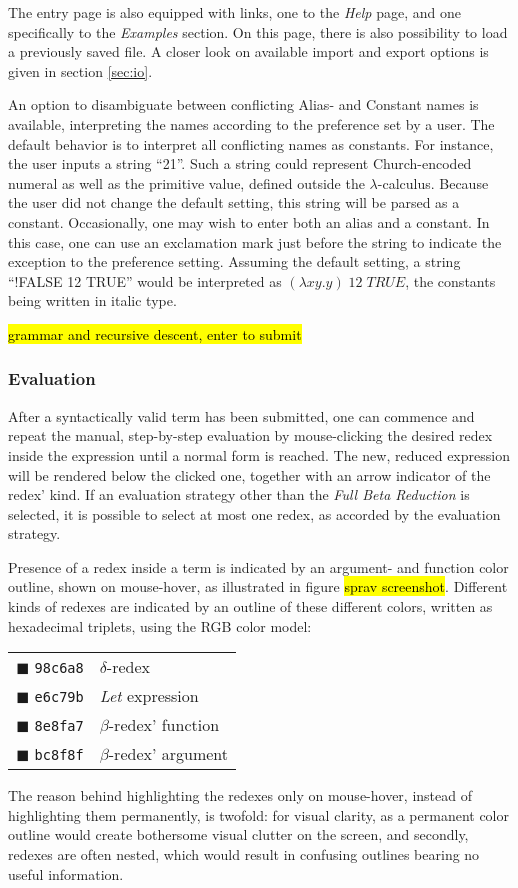 \documentclass[a4paper,10pt]{article}
\begin{document}
The entry page is also equipped with links, one to the \textit{Help} page, and one specifically
to the \textit{Examples} section. On this page, there is
also possibility to load a previously saved file. A closer look on
available import and export options is given in section \ref{sec:io}.

An option to disambiguate between conflicting Alias- and Constant names is available,
interpreting the names according to the preference set by a user. The default behavior is
to interpret all conflicting names as constants. For instance, the user inputs
a string ``21''. Such a string could represent Church-encoded numeral as well as the primitive
value, defined outside the $\lambda$-calculus. Because the user did not change the default
setting, this string will be parsed as a constant. Occasionally, one may wish
to enter both an alias and a constant. In this case, one can use an exclamation mark
just before the string to indicate the exception to the preference setting.
Assuming the default setting, a string ``!FALSE 12 TRUE'' would be interpreted as
$(\lambda xy.y)\;\textit{12}\;\textit{TRUE}$, the constants being written in italic type.

\hl{grammar and recursive descent, enter to submit}

\subsubsection{Evaluation}
After a syntactically valid term has been submitted, one can commence and repeat
the manual, step-by-step evaluation by
mouse-clicking the desired redex inside the expression until a normal form is reached.
The new, reduced expression will be rendered below the clicked one, together
with an arrow indicator of the redex' kind.
If an evaluation strategy other than the \textit{Full Beta Reduction} is selected, 
it is possible to select at most one redex, as accorded by the evaluation strategy.

Presence of a redex inside a term is
indicated by an argument- and function color outline, shown on mouse-hover, as illustrated
in figure \hl{sprav screenshot}. Different kinds of redexes are indicated by an outline of these different colors,
written as hexadecimal triplets, using the RGB color model:
\begin{center}
\begin{tabular}{ll}
	{\color{delta}$\blacksquare$} \texttt{98c6a8}   &$\delta$-redex\\
	{\color{letexpr}$\blacksquare$} \texttt{e6c79b} &\textit{Let} expression\\
	{\color{betaFunc}$\blacksquare$} \texttt{8e8fa7}&$\beta$-redex' function\\
	{\color{betaArg}$\blacksquare$} \texttt{bc8f8f} &$\beta$-redex' argument
\end{tabular}
\end{center}
The reason behind highlighting the redexes only on mouse-hover, instead of highlighting
them permanently, is twofold: for visual clarity, as a permanent color outline would
create bothersome visual clutter on the screen, and secondly, redexes are
often nested, which would result in confusing outlines bearing no useful information.
\end{document}
